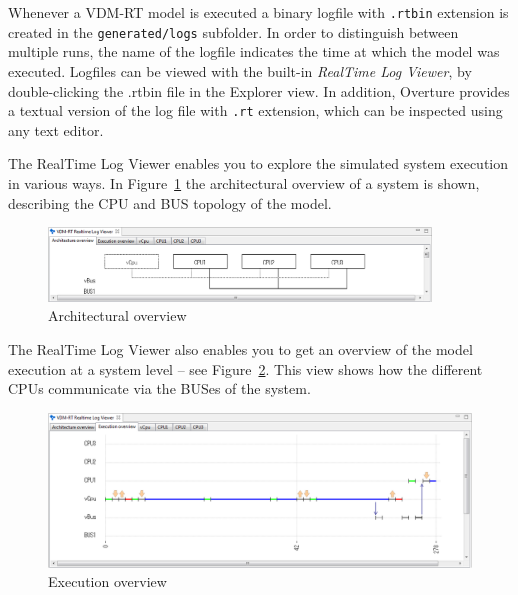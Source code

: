 \documentclass{overturerepchap}
\begin{document}
Whenever a VDM-RT model is executed a binary logfile with \texttt{.rtbin} extension
is created in the \texttt{generated/logs} subfolder. In order to distinguish between multiple runs,
the name of the logfile indicates the time at which the model was executed. Logfiles can be
viewed with the built-in \emph{RealTime Log Viewer},
by double-clicking the .rtbin file in the Explorer view. In addition, Overture provides
a textual version of the log file with \texttt{.rt} extension,
which can be inspected using any text editor.

The RealTime Log Viewer enables
you to explore the simulated system execution in various ways. In
Figure~\ref{fig:userguide:ArchitecturalOverview} the architectural
overview of a system is shown, describing the CPU and BUS topology of
the model.

\begin{figure}[htp]
\begin{center}
  \includegraphics[width=4in]{figures/ArchitectureOverview}
  \caption{Architectural overview}
  \label{fig:userguide:ArchitecturalOverview}
\end{center}
\end{figure}

The RealTime Log Viewer also enables you to get an overview of
the model execution at a system level --
see Figure~\ref{fig:userguide:ExecutionOverview}.
This view shows how the different CPUs communicate via the
BUSes of the system.

\begin{figure}[htp]
\begin{center}
  \includegraphics[width=6in]{figures/ExecutionOverview}
  \caption{Execution overview}
  \label{fig:userguide:ExecutionOverview}
\end{center}
\end{figure}
\end{document}
